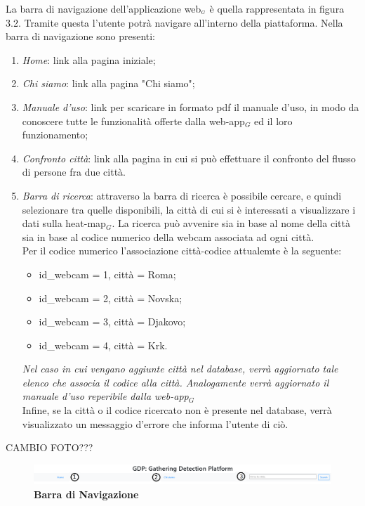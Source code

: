 La barra di navigazione dell'applicazione web$_{\scaleto{G}{3pt}}$ è quella rappresentata in figura 3.2. Tramite questa l'utente potrà navigare all'interno della piattaforma. Nella barra di navigazione sono presenti:
\begin{enumerate}
	\item \textit{Home}: link alla pagina iniziale;
	\item \textit{Chi siamo}: link alla pagina "Chi siamo";
	\item \textit{Manuale d'uso}: link per scaricare in formato pdf il manuale d'uso, in modo da conoscere tutte le funzionalità offerte dalla web-app$_G$ ed il loro funzionamento;
	\item \textit{Confronto città}: link alla pagina in cui si può effettuare il confronto del flusso di persone fra due città.
	\item \textit{Barra di ricerca}: attraverso la barra di ricerca è possibile cercare, e quindi selezionare tra quelle disponibili, la città di cui si è interessati a visualizzare i dati sulla heat-map$_G$. La ricerca può avvenire sia in base al nome della città sia in base al codice numerico della webcam associata ad ogni città. \\
	Per il codice numerico l'associazione città-codice attualemte è la seguente:
	\begin{itemize}
		\item id{\_}webcam = 1, città = Roma;
		\item id{\_}webcam = 2, città = Novska;
		\item id{\_}webcam = 3, città = Djakovo;
		\item id{\_}webcam = 4, città = Krk.
	\end{itemize}
	\textit{Nel caso in cui vengano aggiunte città nel database, verrà aggiornato tale elenco che associa il codice alla città. Analogamente verrà aggiornato il manuale d'uso reperibile dalla web-app$_G$} \\
	Infine, se la città o il codice ricercato non è presente nel database, verrà visualizzato un messaggio d'errore che informa l'utente di ciò.
\end{enumerate}

CAMBIO FOTO???
\begin{center}
	\begin{figure}[H]
		\includegraphics[width=1\linewidth]{../immagini/manualeUtente/BarraDiNavigazioe.png}
		\caption{\textbf{Barra di Navigazione}}
	\end{figure}
\end{center}

